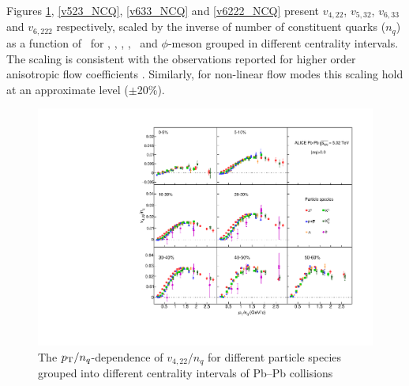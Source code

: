 
Figures \ref{v422_NCQ}, \ref{v523_NCQ}, \ref{v633_NCQ} and \ref{v6222_NCQ} present $v_{4,22}$, $v_{5,32}$, $v_{6,33}$ and $v_{6,222}$ respectively, scaled by the inverse of number of constituent quarks ($n_{q}$) as a function of \pTnq~for \pion, \kaon, \Ks, \proton, \lambdas~and $\phi$-meson grouped in different centrality intervals. The scaling is consistent with the observations reported for higher order anisotropic flow coefficients \cite{Acharya:2018zuq}. Similarly, for non-linear flow modes this scaling hold at an approximate level ($\pm$20\%). 

\begin{figure}[!htb]
\begin{center}
\includegraphics[scale=0.82]{figures/scaling/All_v422_gap00_NCQ_3by3.pdf}
\end{center}
\caption{The $p_{\rm{T}}/n_{q}$-dependence of $v_{4,22}/n_{q}$ for different particle species grouped into different centrality intervals of Pb--Pb collisions \sNN}
\label{v422_NCQ}
\end{figure}


